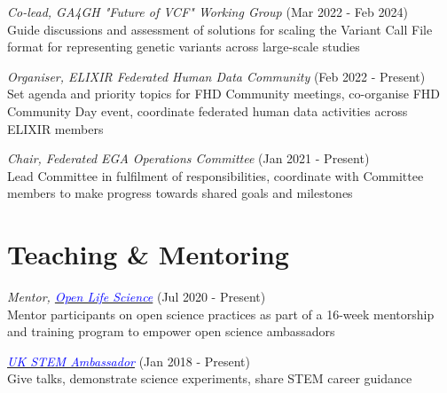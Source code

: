 \documentclass[margin,line]{res}
\begin{document}
\begin{resume}
{\em Co-lead, GA4GH "Future of VCF" Working Group} (Mar 2022 - Feb 2024)\\
Guide discussions and assessment of solutions for scaling the Variant Call File format for representing genetic variants across large-scale studies

{\em Organiser, ELIXIR Federated Human Data Community} (Feb 2022 - Present)\\
Set agenda and priority topics for FHD Community meetings, co-organise FHD Community Day event, coordinate federated human data activities across ELIXIR members

{\em Chair, Federated EGA Operations Committee} (Jan 2021 - Present)\\
Lead Committee in fulfilment of responsibilities, coordinate with Committee members to make progress towards shared goals and milestones

\section{\sc Teaching \& Mentoring}

{\em Mentor, \href{https://openlifesci.org/}{\textcolor{blue}{Open Life Science}}} (Jul 2020 - Present)\\
Mentor participants on open science practices as part of a 16-week mentorship and training program to empower open science ambassadors

{\em \href{https://www.stem.org.uk//}{\textcolor{blue}{UK STEM Ambassador}}} (Jan 2018 - Present)\\
Give talks, demonstrate science experiments, share STEM career guidance





\end{resume}
\end{document}
